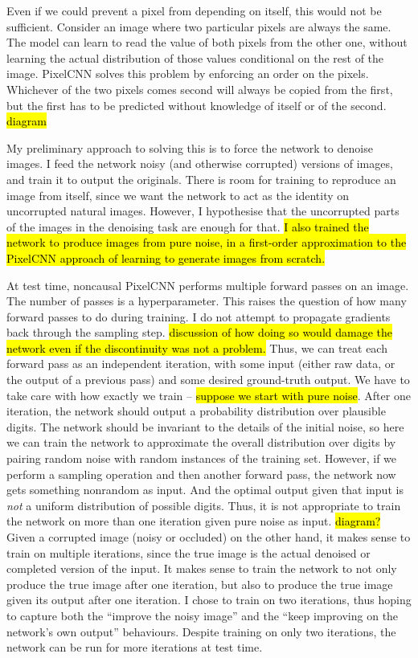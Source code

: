 \documentclass[10pt,a4paper]{article}
\newcommand{\nquote}[1]{``{#1}''}
\begin{document}
Even if we could prevent a pixel from depending on itself, this would not be sufficient. Consider an image where two particular pixels are always the same. The model can learn to read the value of both pixels from the other one, without learning the actual distribution of those values conditional on the rest of the image. PixelCNN solves this problem by enforcing an order on the pixels. Whichever of the two pixels comes second will always be copied from the first, but the first has to be predicted without knowledge of itself or of the second. \hl{diagram}

My preliminary approach to solving this is to force the network to denoise images. I feed the network noisy (and otherwise corrupted) versions of images, and train it to output the originals. There is room for training to reproduce an image from itself, since we want the network to act as the identity on uncorrupted natural images. However, I hypothesise that the uncorrupted parts of the images in the denoising task are enough for that. \hl{I also trained the network to produce images from pure noise, in a first-order approximation to the PixelCNN approach of learning to generate images from scratch.}

At test time, noncausal PixelCNN performs multiple forward passes on an image. The number of passes is a hyperparameter. This raises the question of how many forward passes to do during training. I do not attempt to propagate gradients back through the sampling step. \hl{discussion of how doing so would damage the network even if the discontinuity was not a problem.} Thus, we can treat each forward pass as an independent iteration, with some input (either raw data, or the output of a previous pass) and some desired ground-truth output. We have to take care with how exactly we train -- \hl{suppose we start with pure noise}. After one iteration, the network should output a probability distribution over plausible digits. The network should be invariant to the details of the initial noise, so here we can train the network to approximate the overall distribution over digits by pairing random noise with random instances of the training set. However, if we perform a sampling operation and then another forward pass, the network now gets something nonrandom as input. And the optimal output given that input is \emph{not} a uniform distribution of possible digits. Thus, it is not appropriate to train the network on more than one iteration given pure noise as input. \hl{diagram?} Given a corrupted image (noisy or occluded) on the other hand, it makes sense to train on multiple iterations, since the true image is the actual denoised or completed version of the input. It makes sense to train the network to not only produce the true image after one iteration, but also to produce the true image given its output after one iteration. I chose to train on two iterations, thus hoping to capture both the \nquote{improve the noisy image} and the \nquote{keep improving on the network's own output} behaviours. Despite training on only two iterations, the network can be run for more iterations at test time.
  
\end{document}
